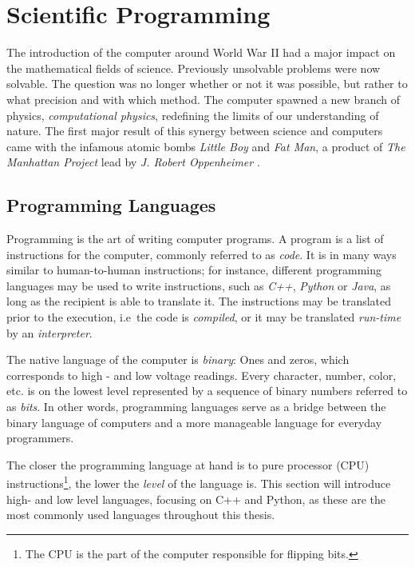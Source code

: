 \chapter{Scientific Programming}
\label{ch:SciProg}

The introduction of the computer around World War II had a major impact on the mathematical fields of science. Previously unsolvable problems were now solvable. The question was no longer whether or not it was possible, but rather to what precision and with which method. The computer spawned a new branch of physics, \textit{computational physics}, redefining the limits of our understanding of nature. The first major result of this synergy between science and computers came with the infamous atomic bombs \textit{Little Boy} and \textit{Fat Man}, a product of \textit{The Manhattan Project} lead by \textit{J. Robert Oppenheimer} \cite{supermen}. 

\section{Programming Languages}

Programming is the art of writing computer programs. A program is a list of instructions for the computer, commonly referred to as \textit{code}. It is in many ways similar to human-to-human instructions; for instance, different programming languages may be used to write instructions, such as \textit{C++}, \textit{Python} or \textit{Java}, as long as the recipient is able to translate it. The instructions may be translated prior to the execution, i.e~the code is \textit{compiled}, or it may be translated \textit{run-time} by an \textit{interpreter}. 

The native language of the computer is \textit{binary}: Ones and zeros, which corresponds to high - and low voltage readings. Every character, number, color, etc. is on the lowest level represented by a sequence of binary numbers referred to as \textit{bits}. In other words, programming languages serve as a bridge between the binary language of computers and a more manageable language for everyday programmers.

The closer the programming language at hand is to pure processor (CPU) instructions\footnote{The CPU is the part of the computer responsible for flipping bits.}, the lower the \textit{level} of the language is. This section will introduce high- and low level languages, focusing on C++ and Python, as these are the most commonly used languages throughout this thesis.   


